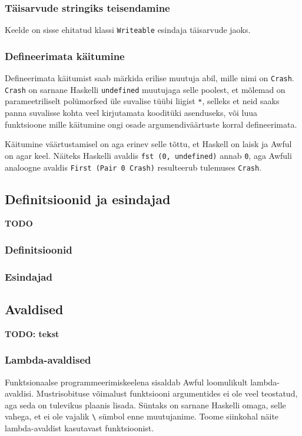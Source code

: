 \documentclass[12pt]{article}
\newcommand\markus[1]{\textcolor{roheline}{\textbf{#1}}}
\begin{document}
      \subsubsection{Täisarvude stringiks teisendamine}
        Keelde on sisse ehitatud klassi \verb!Writeable! esindaja täisarvude jaoks.
      \subsubsection{Defineerimata käitumine}
        Defineerimata käitumist saab märkida erilise muutuja abil, mille nimi on \verb!Crash!. \verb!Crash! on sarnane Haskelli \verb!undefined! muutujaga selle poolest, et mõlemad on parameetriliselt polümorfsed üle suvalise tüübi liigist \verb!*!, selleks et neid saaks panna suvalisse kohta veel kirjutamata kooditüki asenduseks, või luua funktsioone mille käitumine ongi osade argumendiväärtuste korral defineerimata.

        Käitumine väärtustamisel on aga erinev selle tõttu, et Haskell on laisk ja Awful on agar keel. Näiteks Haskelli avaldis \verb!fst (0, undefined)! annab \verb!0!, aga Awfuli analoogne avaldis \verb!First (Pair 0 Crash)! resulteerub tulemuses \verb!Crash!.
    \subsection{Definitsioonid ja esindajad}
      \markus{TODO}
      \subsubsection{Definitsioonid}
        
      \subsubsection{Esindajad}
        
    \subsection{Avaldised}
      \markus{TODO: tekst}
      \subsubsection{Lambda-avaldised}
        Funktsionaalse programmeerimiskeelena sisaldab Awful loomulikult lambda-avaldisi. Mustrisobituse võimalust funktsiooni argumentides ei ole veel teostatud, aga seda on tulevikus plaanis lisada. Süntaks on sarnane Haskelli omaga, selle vahega, et ei ole vajalik \verb!\! sümbol enne muutujanime. Toome siinkohal näite lambda-avaldist kasutavast funktsioonist.
\end{document}
